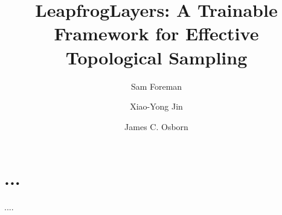 \documentclass[a4paper,11pt]{article}
\title{LeapfrogLayers: A Trainable Framework for Effective Topological Sampling}
\author*[a]{Sam Foreman}
\author[a]{Xiao-Yong Jin}
\author[a]{James C. Osborn}
\affiliation[a]{Argonne National Laboratory,\\
  Lemont, IL}
\begin{document}
\maketitle


\section{...}

\begin{thebibliography}{99}
....

\end{thebibliography}
\end{document}

